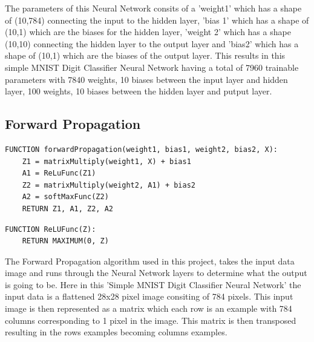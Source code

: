 \documentclass[11pt]{article}
\begin{document}
\vspace{1em}
The parameters of this Neural Network consits of a 'weight1' which has a shape of (10,784) connecting the input to the hidden layer, 'bias 1' which has a shape of (10,1) which are the biases for the hidden layer, 'weight 2' which has a shape (10,10) connecting the hidden layer to the output layer and 'bias2' which has a shape of (10,1) which are the biases of the output layer. This results in this simple MNIST Digit Classifier Neural Network having a total of 7960 trainable parameters with 7840 weights, 10 biases between the input layer and hidden layer, 100 weights, 10 biases between the hidden layer and putput layer.

\subsection{Forward Propagation}

\begin{lstlisting}[language={},mathescape=true, caption={Forward Propagation Pseudocode Algorithm}]
FUNCTION forwardPropagation(weight1, bias1, weight2, bias2, X):
    Z1 = matrixMultiply(weight1, X) + bias1
    A1 = ReLuFunc(Z1)
    Z2 = matrixMultiply(weight2, A1) + bias2
    A2 = softMaxFunc(Z2)
    RETURN Z1, A1, Z2, A2
\end{lstlisting}

\vspace{1em}

\begin{lstlisting}[language={},mathescape=true, caption={ReLu Activation Function Pseudocode}]
FUNCTION ReLUFunc(Z):
    RETURN MAXIMUM(0, Z)
\end{lstlisting}

\vspace{1em}
The Forward Propagation algorithm used in this project, takes the input data image and runs through the Neural Network layers to determine what the output is going to be. Here in this 'Simple MNIST Digit Classifier Neural Network' the input data is a flattened 28x28 pixel image consiting of 784 pixels. This input image is then represented as a matrix which each row is an example with 784 columns corresponding to 1 pixel in the image. This matrix is then transposed resulting in the rows  examples becoming columns examples. 
\end{document}

